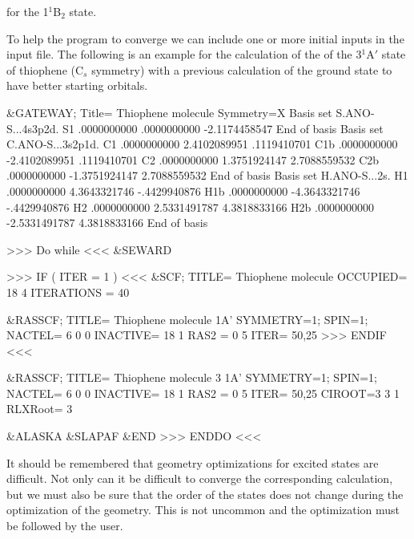 for the 1$^1$B$_2$ state.

To help the program to converge we can include one or more initial 
inputs in the input file. 
The following is an example for the calculation
of the of the 3$^1$A$'$ state of thiophene (C$_s$ symmetry) with a previous
calculation of the ground state to have better starting orbitals.


\begin{inputlisting}
 &GATEWAY; Title= Thiophene molecule
   Symmetry=X
   Basis set
   S.ANO-S...4s3p2d.
   S1              .0000000000         .0000000000       -2.1174458547
   End of basis
   Basis set
   C.ANO-S...3s2p1d.
   C1              .0000000000        2.4102089951         .1119410701
   C1b             .0000000000       -2.4102089951         .1119410701
   C2              .0000000000        1.3751924147        2.7088559532
   C2b             .0000000000       -1.3751924147        2.7088559532
   End of basis
   Basis set
   H.ANO-S...2s.
   H1              .0000000000        4.3643321746        -.4429940876
   H1b             .0000000000       -4.3643321746        -.4429940876
   H2              .0000000000        2.5331491787        4.3818833166
   H2b             .0000000000       -2.5331491787        4.3818833166
   End of basis

>>> Do while <<<
 &SEWARD

>>> IF ( ITER = 1 ) <<<
 &SCF; TITLE= Thiophene molecule
   OCCUPIED= 18 4
   ITERATIONS = 40

 &RASSCF; TITLE= Thiophene molecule 1A'
   SYMMETRY=1; SPIN=1; NACTEL= 6    0    0
   INACTIVE= 18    1
   RAS2    =  0    5
   ITER= 50,25
>>> ENDIF <<<


 &RASSCF; TITLE= Thiophene molecule 3 1A'
   SYMMETRY=1; SPIN=1; NACTEL= 6    0    0
   INACTIVE= 18    1
   RAS2    =  0    5
   ITER= 50,25
   CIROOT=3 3 1
   RLXRoot= 3

 &ALASKA
 &SLAPAF &END
>>> ENDDO <<<
\end{inputlisting}


It should be remembered that geometry optimizations for excited states
are difficult. Not only can it be difficult to converge the corresponding
 calculation, but we must also be sure that the order of the
states does not change during the optimization of the geometry. This is
not uncommon and the optimization must be followed by the user. 

